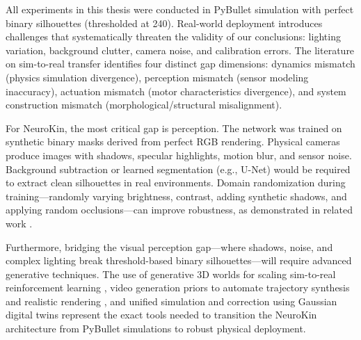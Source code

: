 \documentclass[12pt,a4paper,oneside]{report}
\begin{document}
All experiments in this thesis were conducted in PyBullet simulation with perfect binary silhouettes (thresholded at 240). Real-world deployment introduces challenges that systematically threaten the validity of our conclusions: lighting variation, background clutter, camera noise, and calibration errors. The literature on sim-to-real transfer \cite{tan2018simtoreal, aljalbout2026realitygap} identifies four distinct gap dimensions: dynamics mismatch (physics simulation divergence), perception mismatch (sensor modeling inaccuracy), actuation mismatch (motor characteristics divergence), and system construction mismatch (morphological/structural misalignment).

For NeuroKin, the most critical gap is perception. The network was trained on synthetic binary masks derived from perfect RGB rendering. Physical cameras produce images with shadows, specular highlights, motion blur, and sensor noise. Background subtraction or learned segmentation (e.g., U-Net) would be required to extract clean silhouettes in real environments. Domain randomization during training—randomly varying brightness, contrast, adding synthetic shadows, and applying random occlusions—can improve robustness, as demonstrated in related work \cite{rezvani2024robust, qiu2024swim2real}.

Furthermore, bridging the visual perception gap—where shadows, noise, and complex lighting break threshold-based binary silhouettes—will require advanced generative techniques. The use of generative 3D worlds for scaling sim-to-real reinforcement learning \cite{choi2025scalingsim}, video generation priors to automate trajectory synthesis and realistic rendering \cite{he2025vdreamer}, and unified simulation and correction using Gaussian digital twins \cite{cai2025gausstwin} represent the exact tools needed to transition the NeuroKin architecture from PyBullet simulations to robust physical deployment.
\end{document}

